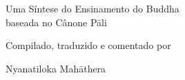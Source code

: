 \cleartorecto
\thispagestyle{empty}
\vspace*{5em}


{\centering

\settowidth{\titleLength}{%
  {\Large\chapterTitleFont\scshape\MakeLowercase{\thetitle}}%
}

{\Large\chapterTitleFont\scshape\MakeLowercase{\thetitle}}\\[0.3\baselineskip]
\raisebox{0.5\xheight}{\color[gray]{0.4}\rule{\titleLength}{0.25pt}}\\[0.3\baselineskip]

Uma Síntese do Ensinamento do Buddha\\
baseada no Cânone Pāli

\vfill

Compilado, traduzido e comentado por

Nyanatiloka Mahāthera


\vspace*{5em}

}

